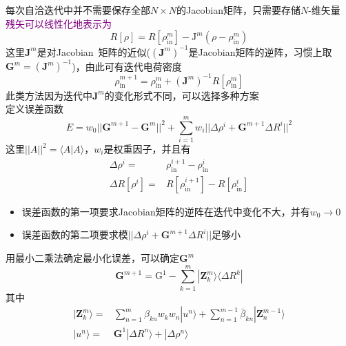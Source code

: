 {\begin{itemize}
	每次自洽迭代中并不需要保存全部$N\times N$的\textrm{Jacobian}矩阵，只需要存储$N$-维矢量\\
	\textcolor{purple}{残矢可以线性化地表示为}
	\begin{displaymath}
		R[\rho]=R[\rho_{\mathrm{in}}^m]-\mathrm{J}^m(\rho-\rho_{\mathrm{in}}^m)
	\end{displaymath}
	这里$\mathbf{J}^m$是对\textrm{Jacobian~}矩阵的近似($(\mathbf{J}^m)^{-1}$是\textrm{Jacobian}矩阵的逆阵，习惯上取$\mathbf{G}^m=(\mathbf{J}^m)^{-1}$)，由此可有迭代电荷密度
	\begin{displaymath}
		\rho_{\mathrm{in}}^{m+1}=\rho_{\mathrm{in}}^m+(\mathbf{J}^m)^{-1}R[\rho_{\mathrm{in}}^m]
	\end{displaymath}
	此类方法因为迭代中$\mathbf{J}^m$的变化形式不同，可以选择多种方案\\
	定义误差函数
	\begin{displaymath}
		E=w_0||\mathbf{G}^{m+1}-\mathbf{G}^m||^2+\sum_{i=1}^mw_i||\Delta\rho^i+\mathbf{G}^{m+1}\Delta R^i||^2
	\end{displaymath}
	这里$||A||^2=\langle A|A\rangle$，$w_i$是权重因子，并且有
	\begin{displaymath}
		\begin{aligned}
			\Delta\rho^i=&\rho_{\mathrm{in}}^{i+1}-\rho_{\mathrm{in}}^{i}\\
			\Delta R[\rho^i]=&R[\rho_{\mathrm{in}}^{i+1}]-R[\rho_{\mathrm{in}}^{i}]
		\end{aligned}
	\end{displaymath}
	\begin{itemize}
		\item 误差函数的第一项要求\textrm{Jacobian}矩阵的逆阵在迭代中变化不大，并有$w_0\rightarrow0$
		\item 误差函数的第二项要求模$||\Delta\rho^i+\mathbf{G}^{m+1}\Delta R^i||$足够小
	\end{itemize}
	用最小二乘法确定最小化误差，可以确定$\mathbf{G}^m$
	\begin{displaymath}
		\mathbf{G}^{m+1}=\mathrm{G}^1-\sum_{k=1}^m|\mathbf{Z}_k^m\rangle\langle\Delta R^k|
	\end{displaymath}
	其中
	\begin{displaymath}
		\begin{aligned}
			|\mathbf{Z}_k^m\rangle=&\sum_{n=1}^m\beta_{kn}w_kw_n|u^n\rangle+\sum_{n=1}^{m-1}\bar{\beta}_{kn}|\mathbf{Z}_n^{m-1}\rangle\\
			|u^n\rangle=&\mathbf{G}^1|\Delta R^n\rangle+|\Delta \rho^n\rangle
		\end{aligned}

\end{displaymath}
\end{itemize}}
